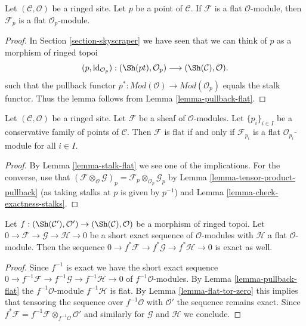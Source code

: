 \begin{lemma}
\label{lemma-stalk-flat}
Let $(\mathcal{C}, \mathcal{O})$ be a ringed site.
Let $p$ be a point of $\mathcal{C}$.
If $\mathcal{F}$ is a flat $\mathcal{O}$-module, then
$\mathcal{F}_p$ is a flat $\mathcal{O}_p$-module.
\end{lemma}

\begin{proof}
In Section \ref{section-skyscraper} we have seen
that we can think of $p$ as a morphism of ringed topoi
$$
(p, \text{id}_{\mathcal{O}_p}) :
(\Sh(pt), \mathcal{O}_p)
\longrightarrow
(\Sh(\mathcal{C}), \mathcal{O}).
$$
such that the pullback functor
$p^* : \textit{Mod}(\mathcal{O}) \to \textit{Mod}(\mathcal{O}_p)$
equals the stalk functor. Thus the lemma follows from
Lemma \ref{lemma-pullback-flat}.
\end{proof}

\begin{lemma}
\label{lemma-check-flat-stalks}
Let $(\mathcal{C}, \mathcal{O})$ be a ringed site.
Let $\mathcal{F}$ be a sheaf of $\mathcal{O}$-modules.
Let $\{p_i\}_{i \in I}$ be a conservative family of points of $\mathcal{C}$.
Then $\mathcal{F}$ is flat if and only if $\mathcal{F}_{p_i}$ is
a flat $\mathcal{O}_{p_i}$-module for all $i \in I$.
\end{lemma}

\begin{proof}
By
Lemma \ref{lemma-stalk-flat}
we see one of the implications.
For the converse, use that
$(\mathcal{F} \otimes_\mathcal{O} \mathcal{G})_p =
\mathcal{F}_p \otimes_{\mathcal{O}_p} \mathcal{G}_p$
by
Lemma \ref{lemma-tensor-product-pullback} (as taking stalks at $p$
is given by $p^{-1}$) and
Lemma \ref{lemma-check-exactness-stalks}.
\end{proof}

\begin{lemma}
\label{lemma-pullback-ses}
Let
$f : (\Sh(\mathcal{C}'), \mathcal{O}') \to (\Sh(\mathcal{C}), \mathcal{O})$
be a morphism of ringed topoi. Let
$0 \to \mathcal{F} \to \mathcal{G} \to \mathcal{H} \to 0$
be a short exact sequence of $\mathcal{O}$-modules with $\mathcal{H}$
a flat $\mathcal{O}$-module. Then the sequence
$0 \to f^*\mathcal{F} \to f^*\mathcal{G} \to f^*\mathcal{H} \to 0$
is exact as well.
\end{lemma}

\begin{proof}
Since $f^{-1}$ is exact we have the short exact sequence
$0 \to f^{-1}\mathcal{F} \to f^{-1}\mathcal{G} \to f^{-1}\mathcal{H} \to 0$
of $f^{-1}\mathcal{O}$-modules. By
Lemma \ref{lemma-pullback-flat}
the $f^{-1}\mathcal{O}$-module $f^{-1}\mathcal{H}$ is flat. By
Lemma \ref{lemma-flat-tor-zero} this implies that tensoring the sequence
over $f^{-1}\mathcal{O}$ with $\mathcal{O}'$ the sequence
remains exact. Since
$f^*\mathcal{F} = f^{-1}\mathcal{F} \otimes_{f^{-1}\mathcal{O}} \mathcal{O}'$
and similarly for $\mathcal{G}$ and $\mathcal{H}$ we conclude.
\end{proof}





